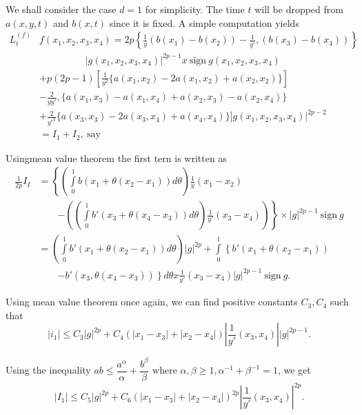 \setcounter{proofofsublemma}{2}
\begin{proofofsublemma}\label{c1:prflem1.4.3}%
  We shall consider the case $d=1$ for simplicity. The time $t$ will
  be dropped from $a (x,y,t)$ and $b(x,t)$ since it is fixed. A simple
  computation yields 
\begin{align*}
  L^{(f)}_t & f(x_1,x_2,x_3, x_4)  = 2p \left\{ \frac{1}{y} (b (x_1) -
  b(x_2))- \frac{1}{y'},(b (x_3) - b(x_4))\right\}\\ 
  &\hspace{2cm} |g(x_1,x_2,x_3, x_4)|^{2p-1} x ~\text{sign}~ g(x_1,x_2,x_3, x_4)\\ 
 & + p(2p-1) \left[\frac{1}{y^2} \{ a (x_1,x_2) - 2a  (x_1,x_2) + a
    (x_2,x_2)\}\right] \\
 & - \frac{2}{yy'}, \{ a (x_1,x_3) -a(x_1,x_4)+a(x_2,x_3)-a(x_2,x_4) \}\\
 & +  \frac{2}{y'^2} \{ a (x_3,x_3) -2a(x_3,x_4)+a(x_4,x_4)\}] g
   (x_1,x_2,x_3, x_4)|^{2p-2}\\ 
  &  = I_1 + I_2, ~\text{say}~  \tag{1.4.3}\label{c1:eq1.4.3}
\end{align*}
\end{proofofsublemma}


Using\pageoriginale mean value theorem the first tern is written as 
\begin{align*}
  \frac{1}{2p}I_I & = \left\{ \left(\int\limits_0^1 b (x_1 +  \theta (x_2-x_1))
  d \theta\right) \frac{1}{y} (x_1-x_2)\right.\\
  &\qquad \left.-\left(\left(\int\limits_0^1 b'(x_3 + \theta
  (x_4-x_3)) d \theta\right) \frac{1}{y'} (x_3-x_4)\right)\right\} 
  \times  |g|^{2p-1} ~\text{sign}~ g\\
  & = \left(\int\limits_0^1 b'(x_1 + \theta (x_2-x_1)) d \theta\right)
  |g|^{2p} + \int\limits_0^1 \left\{ b'(x_1 + \theta
  (x_2-x_1))\right.\\ 
  &\qquad \left.-b'(x_3, \theta
  (x_4-x_3))\right\} d \theta x \frac{1}{y'} (x_3-x_4) |g|^{2p-1}
  ~\text{sign}~g.  
\end{align*}

Using mean value theorem once again, we can find positive constants
$C_3, C_4$ such that  
$$
|i_1| \le C_3 |g|^{2p} + C_4 (|x_1-x_3|+|x_2-x_4|)|\frac{1}{y'}
(x_3,x_4)||g|^{2p-1}. 
$$

Using the inequality $ab \le \dfrac{a^\alpha}{\alpha} +
\dfrac{b^\beta}{\beta}$ where $\alpha, \beta \ge 1, \alpha^{-1} +
\beta^{-1} = 1$, we get  
\begin{equation*}
  |I_1| \le C_5 |g|^{2p} + C_6 (|x_1-x_3|+|x_2-x_4|)^{2p}|\frac{1}{y'}
  (x_3,x_4)|^{2p}. \tag{1.4.4}\label{c1:lem1.4.4} 
\end{equation*}


